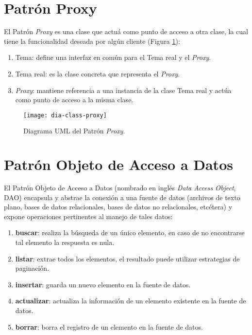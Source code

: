 \section{Patrón Proxy}\label{sec:proxy}
El Patrón \textit{Proxy} es una clase que actuá como punto de acceso a otra clase, la cual tiene la funcionalidad deseada por algún cliente\cite{DesignPatternsLasater} (Figura \ref{fig:dia-class-proxy}):
\begin{enumerate}
  \item Tema: define una interfaz en común para el Tema real y el \textit{Proxy}.
  \item Tema real: es la clase concreta que representa el \textit{Proxy}.
  \item \textit{Proxy}: mantiene referencia a una instancia de la clase Tema real y actúa como punto de acceso a la misma clase.
\end{enumerate}
\begin{figure}[h]
  \centering
  \texttt{[image: dia-class-proxy]}
  \caption{Diagrama UML del Patrón \textit{Proxy}\cite{DesignPatternsLasater}.}
  \label{fig:dia-class-proxy}
\end{figure}
\section{Patrón Objeto de Acceso a Datos}\label{sec:dao}
El Patrón Objeto de Acceso a Datos (nombrado en inglés \textit{Data Access Object}, DAO) encapsula y abstrae la conexión a una fuente de datos (archivos de texto plano, bases de datos relacionales, bases de datos no relacionales, etcétera) y expone operaciones pertinentes al manejo de tales datos\cite{OCPJavaSE7,OCAPJavaSE7}:
\begin{enumerate}
	\item [] \textbf{buscar}: realiza la búsqueda de un único elemento, en caso de no encontrarse tal elemento la respuesta es nula.
	\item [] \textbf{listar}: extrae todos los elementos, el resultado puede utilizar estrategias de paginación.
	\item [] \textbf{insertar}: guarda un nuevo elemento en la fuente de datos.
	\item [] \textbf{actualizar}: actualiza la información de un elemento existente en la fuente de datos.
	\item [] \textbf{borrar}: borra el registro de un elemento en la fuente de datos.
\end{enumerate}
